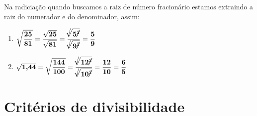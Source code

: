 \noindent Na radiciação quando buscamos a raiz de número fracionário estamos extraindo a raiz do numerador e do denominador, assim:
\begin{enumerate}[label=\alph*)]
	\item $\sqrt{\dfrac{\textbf{25}}{\textbf{81}}} = \dfrac{\sqrt{\textbf{25}}}{\sqrt{\textbf{81}}} = \dfrac{\sqrt[\cancel{}]{\textbf{5}\cancel{^2}}}{\sqrt[\cancel{}]{\textbf{9}\cancel{^2}}} = \dfrac{\textbf{5}}{\textbf{9}}$
	\item $\sqrt{\textbf{1,44}} = \sqrt{\dfrac{\textbf{144}}{\textbf{100}}} = \dfrac{\sqrt[\cancel{}]{\textbf{12}\cancel{^2}}}{\sqrt[\cancel{}]{\textbf{10}\cancel{^2}}} = \dfrac{\textbf{12}}{\textbf{10}} = \dfrac{\textbf{6}}{\textbf{5}}$ \\
\end{enumerate}

\section{Critérios de divisibilidade}

